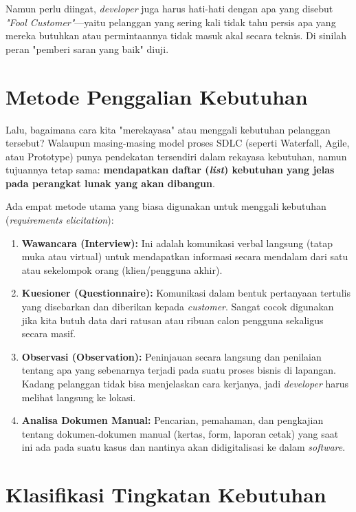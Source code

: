 \documentclass[12pt,a4paper]{article}
\begin{document}
Namun perlu diingat, \textit{developer} juga harus hati-hati dengan apa yang disebut \textit{"Fool Customer"}—yaitu pelanggan yang sering kali tidak tahu persis apa yang mereka butuhkan atau permintaannya tidak masuk akal secara teknis. Di sinilah peran "pemberi saran yang baik" diuji.

\newpage
\section{Metode Penggalian Kebutuhan}

Lalu, bagaimana cara kita "merekayasa" atau menggali kebutuhan pelanggan tersebut? Walaupun masing-masing model proses SDLC (seperti Waterfall, Agile, atau Prototype) punya pendekatan tersendiri dalam rekayasa kebutuhan, namun tujuannya tetap sama: \textbf{mendapatkan daftar (\textit{list}) kebutuhan yang jelas pada perangkat lunak yang akan dibangun}.

Ada empat metode utama yang biasa digunakan untuk menggali kebutuhan (\textit{requirements elicitation}):

\begin{enumerate}
    \item \textbf{Wawancara (Interview):}
    Ini adalah komunikasi verbal langsung (tatap muka atau virtual) untuk mendapatkan informasi secara mendalam dari satu atau sekelompok orang (klien/pengguna akhir). 
    \item \textbf{Kuesioner (Questionnaire):}
    Komunikasi dalam bentuk pertanyaan tertulis yang disebarkan dan diberikan kepada \textit{customer}. Sangat cocok digunakan jika kita butuh data dari ratusan atau ribuan calon pengguna sekaligus secara masif.
    \item \textbf{Observasi (Observation):}
    Peninjauan secara langsung dan penilaian tentang apa yang sebenarnya terjadi pada suatu proses bisnis di lapangan. Kadang pelanggan tidak bisa menjelaskan cara kerjanya, jadi \textit{developer} harus melihat langsung ke lokasi.
    \item \textbf{Analisa Dokumen Manual:}
    Pencarian, pemahaman, dan pengkajian tentang dokumen-dokumen manual (kertas, form, laporan cetak) yang saat ini ada pada suatu kasus dan nantinya akan didigitalisasi ke dalam \textit{software}.
\end{enumerate}

\newpage
\section{Klasifikasi Tingkatan Kebutuhan}
\end{document}
